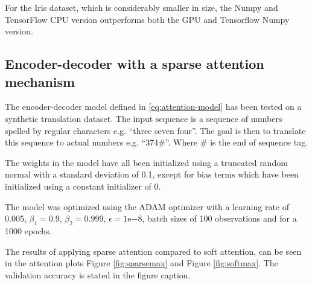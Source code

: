 For the Iris dataset, which is considerably smaller in size, the Numpy and TensorFlow CPU version outperforms both the GPU and Tensorflow Numpy version.

\subsection{Encoder-decoder with a sparse attention mechanism}
The encoder-decoder model defined in \eqref{eq:attention-model} has been tested on a synthetic translation dataset. The input sequence is a sequence of numbers spelled by regular characters e.g. ``three seven four''. The goal is then to translate this sequence to actual numbers e.g. ``374\#''. Where \# is the end of sequence tag.

The weights in the model have all been initialized using a truncated random normal with a standard deviation of 0.1, except for bias terms which have been initialized using a constant initializer of 0.

The model was optimized using the ADAM optimizer with a learning rate of 0.005, $\beta_1=0.9, \, \beta_2 = 0.999, \, \epsilon = 1\mathrm{e}{-8}$, batch sizes of 100 observations and for a 1000 epochs.

The results of applying sparse attention compared to soft attention, can be seen in the attention plots Figure \ref{fig:sparsemax} and Figure \ref{fig:softmax}. The validation accuracy is stated in the figure caption.

